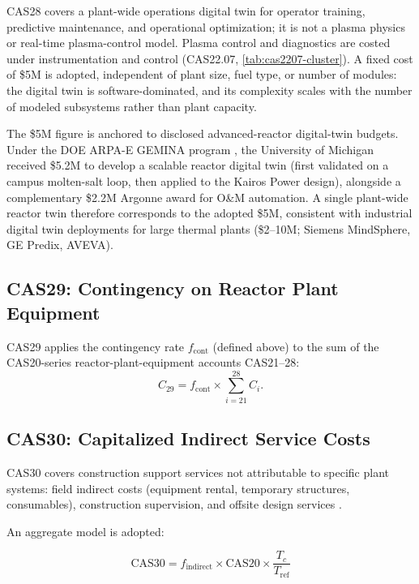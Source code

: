 \documentclass{article}
\begin{document}
CAS28 covers a plant-wide operations digital twin for operator training,
predictive maintenance, and operational optimization; it is not a plasma
physics or real-time plasma-control model. Plasma control and diagnostics
are costed under instrumentation and control (CAS22.07,
\cref{tab:cas2207-cluster}). A fixed cost of \$5M is adopted,
independent of plant size, fuel type, or number of modules: the digital twin
is software-dominated, and its complexity scales with the number of modeled
subsystems rather than plant capacity.

The \$5M figure is anchored to disclosed advanced-reactor digital-twin
budgets. Under the DOE ARPA-E GEMINA program \citep{arpae_gemina2020}, the
University of Michigan received \$5.2M to develop a scalable reactor digital
twin (first validated on a campus molten-salt loop, then applied to the
Kairos Power design), alongside a complementary \$2.2M Argonne award for
O\&M automation. A single plant-wide reactor twin therefore corresponds to the
adopted \$5M, consistent with industrial digital twin deployments for large
thermal plants (\$2--10M; Siemens MindSphere, GE Predix, AVEVA).


\subsection{CAS29: Contingency on Reactor Plant Equipment}
\label{sec:cas29}

CAS29 applies the contingency rate $f_{\text{cont}}$ (defined above) to
the sum of the CAS20-series reactor-plant-equipment accounts CAS21--28:
\begin{equation}
\label{eq:cas29}
C_{29} = f_{\text{cont}} \times \sum_{i=21}^{28} C_i .
\end{equation}


\subsection{CAS30: Capitalized Indirect Service Costs}
\label{sec:cas30}

CAS30 covers construction support services not attributable to specific
plant systems: field indirect costs (equipment rental, temporary
structures, consumables), construction supervision, and offsite design
services \citep{emwg2007}.

An aggregate model is adopted:

\begin{equation}
\label{eq:cas30}
\text{CAS30} = f_{\text{indirect}} \times \text{CAS20} \times
               \frac{T_c}{T_{\text{ref}}}
\end{equation}
\end{document}
